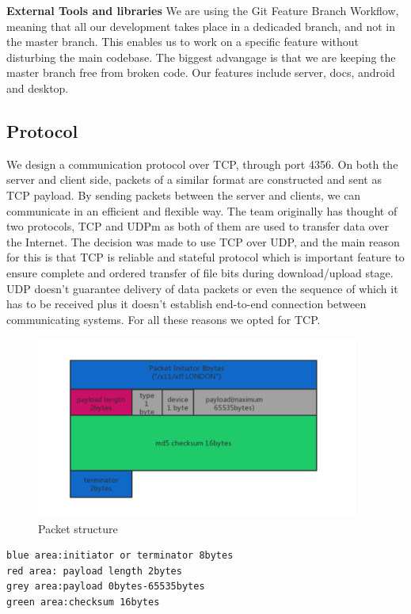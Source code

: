 \documentclass{article}
\begin{document}
\textbf{External Tools and libraries}
We are using the Git Feature Branch Workflow, meaning that all our development takes place in a dedicaded branch, and not in the master branch. This enables us to work on a specific feature without disturbing the main codebase. The biggest advangage is that we are keeping the master branch free from broken code. Our features include server, docs, android and desktop.

\subsection{Protocol}

We design a communication protocol over TCP, through port 4356. On both the server and client side, packets of a similar format are constructed and sent as TCP payload. By sending packets between the server and clients, we can communicate in an efficient and flexible way.
\newline
\hfill \break
 The team originally has thought of two protocols, TCP and UDPm as both of them are used to transfer data over the Internet. The decision was made to use TCP over UDP, and the main reason for this is that TCP is reliable and stateful protocol which is important feature to ensure complete and ordered transfer of file bits during download/upload stage. UDP doesn’t guarantee delivery of data packets or even the sequence of which it has to be received plus it doesn’t establish end-to-end connection between communicating systems. For all these reasons we opted for TCP.

\begin{figure}[H]
    \centering
    \includegraphics[width=0.95\textwidth]{packet}
    \caption{Packet structure}
    \label{fig:packet1}
\end{figure}

\begin{lstlisting}
blue area:initiator or terminator 8bytes
red area: payload length 2bytes
grey area:payload 0bytes-65535bytes
green area:checksum 16bytes
\end{lstlisting}
\end{document}
